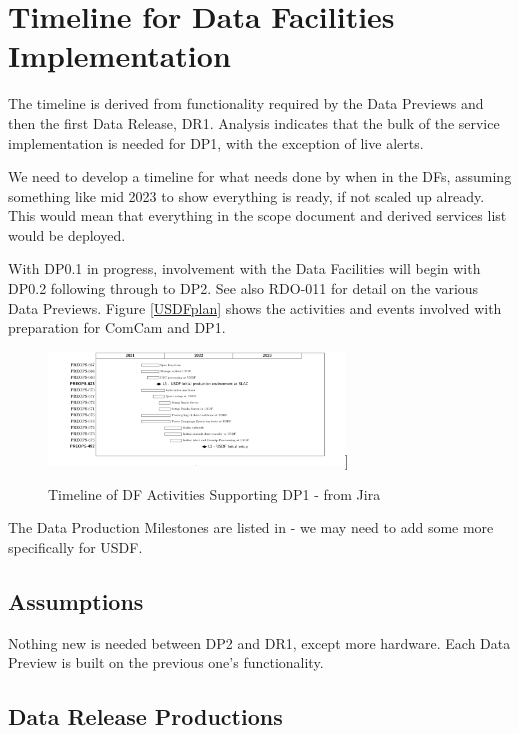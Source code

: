 
\section{Timeline for Data Facilities Implementation}\label{sec:timeline}

The timeline is derived from functionality required by the Data
Previews and then the first Data \gls{Release}, DR1. Analysis indicates that
the bulk of the service implementation is needed for \gls{DP1}, with the
exception of live alerts.

We need to develop a timeline for what needs done by when in the DFs, assuming something like mid 2023 to show everything is ready, if not scaled up already.
This would mean that everything in the scope document and derived services list would be deployed.

With \gls{DP0}.1 in progress, involvement with the Data Facilities will
begin with \gls{DP0}.2  following through to \gls{DP2}.
See also \gls{RDO}-011 for detail on the various Data Previews. Figure
\ref{USDFplan} shows the activities and events involved with
preparation for ComCam and DP1.

\begin{figure}
\includegraphics[width=0.7\textwidth]{USDFplan}]
\caption{Timeline of DF Activities Supporting DP1 - from Jira }
\label{gtimeline}
\end{figure}

The Data Production Milestones are listed in  - we may need to add some more specifically for \gls{USDF}.


\subsection{Assumptions}

Nothing new is needed between \gls{DP2} and \gls{DR1}, except more
hardware. Each Data Preview is built on the previous one's functionality.

\subsection{Data \gls{Release} Productions}
